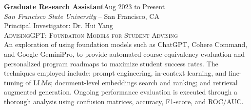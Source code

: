 \documentclass[hidelinks, 10pt]{article}
\begin{document}
{{\hrulefill

\vspace{4mm}

\begin{minipage}[ct]{0.9\linewidth}
\textbf{Graduate Research Assistant}\hfill Aug 2023 to Present\\
\emph{San Francisco State University} -- San Francisco, CA\\
Principal Investigator: Dr. Hui Yang\\
{\textsc{AdvisingGPT: Foundation Models for Student Advising}}
\vspace{1mm}\\
An exploration of using foundation models such as ChatGPT, Cohere Command, and Google
GeminiPro, to provide automated course equivalency evaluation and personalized
program roadmaps to maximize student success rates. The techniques employed
include: prompt engineering, in-context learning, and fine-tuning of LLMs;
document-level embeddings search and ranking; and retrieval augmented
generation.  Ongoing performance evaluation is executed through a thorough analysis
using confusion matrices, accuracy, F1-score, and ROC/AUC.
\end{minipage}

\vspace{4mm}

}}
\end{document}
